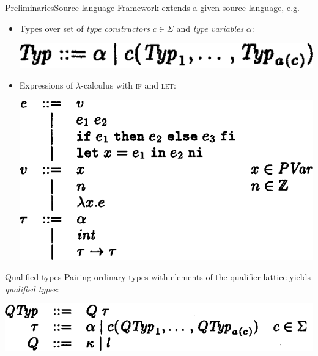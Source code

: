 \documentclass{beamer}
\begin{document}
\begin{frame}{Preliminaries}{Source language}
  Framework extends a given source language, e.g.\
  \begin{itemize}
  \item Types over set of \emph{type constructors} $c \in \Sigma$ and \emph{type variables} $\alpha$:
    \begin{center}\includegraphics[scale=0.25]{paper_typ.png}\end{center}
  \item Expressions of $\lambda$-calculus with \textsc{if} and \textsc{let}:
    \begin{center}\includegraphics[scale=0.25]{paper_sourcelang.png}\end{center}
  \end{itemize}
\end{frame}



\begin{frame}{Qualified types}
  Pairing ordinary types with elements of the qualifier lattice yields \emph{qualified types}:
  \begin{center}\includegraphics[scale=0.25]{paper_qtyp.png}\end{center}
\end{frame}
\end{document}
